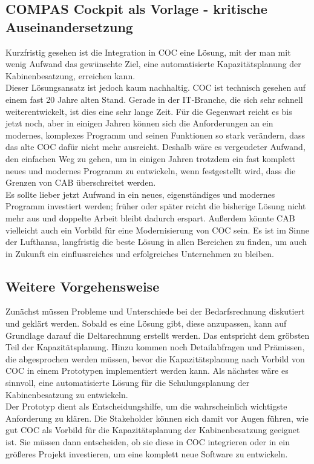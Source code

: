 \documentclass [12pt, a4paper, oneside, titlepage, ngerman]{article}
\begin{document}
\subsection{COMPAS Cockpit als Vorlage - kritische Auseinandersetzung}
Kurzfristig gesehen ist die Integration in \ac{COC} eine Lösung, mit der man mit wenig Aufwand das gewünschte Ziel, eine automatisierte Kapazitätsplanung der Kabinenbesatzung, erreichen kann.\\
Dieser Lösungsansatz ist jedoch kaum nachhaltig. \ac{COC} ist technisch gesehen auf einem fast 20 Jahre alten Stand. Gerade in der IT-Branche, die sich sehr schnell weiterentwickelt, ist dies eine sehr lange Zeit. Für die Gegenwart reicht es bis jetzt noch, aber in einigen Jahren können sich die Anforderungen an ein modernes, komplexes Programm und seinen Funktionen so stark verändern, dass das alte \ac{COC} dafür nicht mehr ausreicht. Deshalb wäre es vergeudeter Aufwand, den einfachen Weg zu gehen, um in einigen Jahren trotzdem ein fast komplett neues und modernes Programm zu entwickeln, wenn festgestellt wird, dass die Grenzen von \ac{CAB} überschreitet werden. \\
Es sollte lieber jetzt Aufwand in ein neues, eigenständiges und modernes Programm investiert werden; früher oder später reicht die bisherige Lösung nicht mehr aus und doppelte Arbeit bleibt dadurch erspart. Außerdem könnte \ac{CAB} vielleicht auch ein Vorbild für eine Modernisierung von \ac{COC} sein. Es ist im Sinne der Lufthansa, langfristig die beste Lösung in allen Bereichen zu finden, um auch in Zukunft ein einflussreiches und erfolgreiches Unternehmen zu bleiben.

\subsection{Weitere Vorgehensweise}
Zunächst müssen Probleme und Unterschiede bei der Bedarfsrechnung diskutiert und geklärt werden. Sobald es eine Lösung gibt, diese anzupassen, kann auf Grundlage darauf die Deltarechnung erstellt werden. Das entspricht dem gröbsten Teil der Kapazitätsplanung. Hinzu kommen noch Detailabfragen und Prämissen, die abgesprochen werden müssen, bevor die Kapazitätsplanung nach Vorbild von \ac{COC} in einem Prototypen implementiert werden kann. Als nächstes wäre es sinnvoll, eine automatisierte Lösung für die Schulungsplanung der Kabinenbesatzung zu entwickeln. \\
Der Prototyp dient als Entscheidungshilfe, um die wahrscheinlich wichtigste Anforderung zu klären. Die Stakeholder können sich damit vor Augen führen, wie gut \ac{COC} als Vorbild für die Kapazitätsplanung der Kabinenbesatzung geeignet ist. Sie müssen dann entscheiden, ob sie diese in \ac{COC} integrieren oder in ein größeres Projekt investieren, um eine komplett neue Software zu entwickeln.
\end{document}
